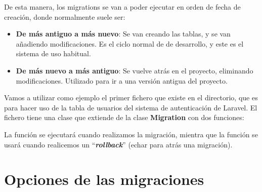 De esta manera, los migrations se van a poder ejecutar en orden de fecha de creación, donde normalmente suele ser:
\begin{itemize}
    \item \textbf{De más antiguo a más nuevo}: Se van creando las tablas, y se van añadiendo modificaciones. Es el ciclo normal de de desarrollo, y este es el sistema de uso habitual.
    \item \textbf{De más nuevo a más antiguo}: Se vuelve atrás en el proyecto, eliminando modificaciones. Utilizado para ir a una versión antigua del proyecto.
\end{itemize}

Vamos a utilizar como ejemplo el primer fichero que existe en el directorio, que es para hacer uso de la tabla de usuarios del sistema de autenticación de Laravel. El fichero tiene una clase que extiende de la clase \textbf{Migration} con dos funciones:


La función  se ejecutará cuando realizamos la migración, mientra que la función  se usará cuando realicemos un “\textbf{\textit{rollback}}” (echar para atrás una migración).



\section{Opciones de las migraciones}

